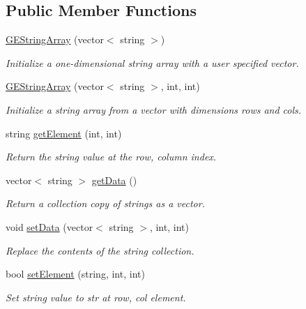 \subsection*{Public Member Functions}
\begin{DoxyCompactItemize}
\item 
\hyperlink{class_g_e_string_array_aaf81307ac900cd22af6ced6b9ec45a0a}{G\-E\-String\-Array} (vector$<$ string $>$)
\begin{DoxyCompactList}\small\item\em Initialize a one-\/dimensional string array with a user specified vector. \end{DoxyCompactList}\item 
\hyperlink{class_g_e_string_array_abdaadc4a69d887cd739bbfc89ce60cc4}{G\-E\-String\-Array} (vector$<$ string $>$, int, int)
\begin{DoxyCompactList}\small\item\em Initialize a string array from a vector with dimensions {\itshape rows} and {\itshape cols}. \end{DoxyCompactList}\item 
string \hyperlink{class_g_e_string_array_a08286cc58c2762039163cc69a9ecf6bd}{get\-Element} (int, int)
\begin{DoxyCompactList}\small\item\em Return the string value at the {\itshape row}, {\itshape column} index. \end{DoxyCompactList}\item 
vector$<$ string $>$ \hyperlink{class_g_e_string_array_abe983e94d9cde5eecf91c04c8cf65451}{get\-Data} ()
\begin{DoxyCompactList}\small\item\em Return a collection copy of strings as a vector. \end{DoxyCompactList}\item 
void \hyperlink{class_g_e_string_array_a7af740d20e04b0d9ba770cff04b2437e}{set\-Data} (vector$<$ string $>$, int, int)
\begin{DoxyCompactList}\small\item\em Replace the contents of the string collection. \end{DoxyCompactList}\item 
bool \hyperlink{class_g_e_string_array_a0b65a5a901e490040840025322cbd731}{set\-Element} (string, int, int)
\begin{DoxyCompactList}\small\item\em Set string value to {\itshape str} at {\itshape row}, {\itshape col} element. \end{DoxyCompactList}\item 

\end{DoxyCompactItemize}
